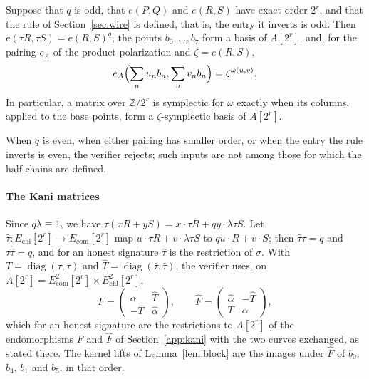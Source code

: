 \documentclass[version=preprint]{iacrcc}
\newcommand{\Ecom}{E_{\mathrm{com}}}
\newcommand{\Echl}{E_{\mathrm{chl}}}
\begin{document}
    \begin{lemma}
        \label{lem:basepoints}
        Suppose that $q$ is odd, that $e(P, Q)$ and $e(R, S)$ have exact order
        $2^r$, and that the rule of Section~\ref{sec:wire} is defined, that is,
        the entry it inverts is odd. Then $e(\tau R, \tau S) =
        e(R, S)^q$, the points $b_0, \ldots, b_7$ form a basis of $A[2^r]$, and,
        for the pairing $e_A$ of the product polarization and $\zeta = e(R, S)$,
        \[
        e_A\Bigl(\sum_n u_n b_n, \sum_n v_n b_n\Bigr) = \zeta^{\omega(u, v)}.
        \]
        In particular, a matrix over $\mathbb Z/2^r$ is symplectic for $\omega$
        exactly when its columns, applied to the base points, form a
        $\zeta$-symplectic basis of $A[2^r]$.
    \end{lemma}


    When $q$ is even, when either pairing has smaller order, or when the entry
    the rule inverts is even, the verifier rejects; such inputs are not among those for which
    the half-chains are defined.

    \paragraph{The Kani matrices}
    Since $q\lambda \equiv 1$, we have $\tau(xR + yS) = x \cdot \tau R + qy \cdot
    \lambda \tau S$. Let $\widehat\tau \colon \Echl[2^r] \to \Ecom[2^r]$ map $u
    \cdot \tau R + v \cdot \lambda \tau S$ to $qu \cdot R + v \cdot S$; then
    $\widehat\tau\tau = q$ and $\tau\widehat\tau = q$, and for an honest
    signature $\widehat\tau$ is the restriction of $\sigma$. With $T =
    \operatorname{diag}(\tau, \tau)$ and $\widehat T =
    \operatorname{diag}(\widehat\tau, \widehat\tau)$, the verifier uses, on
    $A[2^r] = \Ecom^2[2^r] \times \Echl^2[2^r]$,
    \[
    F = \begin{pmatrix} \alpha & \widehat T \\ -T & \widehat\alpha
    \end{pmatrix},
    \qquad
    \widehat F = \begin{pmatrix} \widehat\alpha & -\widehat T \\ T & \alpha
    \end{pmatrix},
    \]
    which for an honest signature are the restrictions to $A[2^r]$ of the
    endomorphisms $F$ and $\widehat F$ of Section~\ref{app:kani} with the two
    curves exchanged, as stated there. The kernel lifts of
    Lemma~\ref{lem:block} are the images under $\widehat F$ of $b_0$, $b_4$,
    $b_1$ and $b_5$, in that order.
\end{document}

